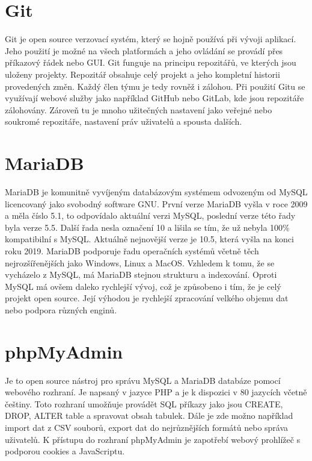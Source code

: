 \section{Git}

Git je open source verzovací systém, který se hojně používá při vývoji
aplikací. Jeho použití je možné na všech platformách a jeho ovládání
se provádí přes příkazový řádek nebo GUI. Git funguje na principu
repozitářů, ve kterých jsou uloženy projekty. Repozitář obsahuje celý
projekt a jeho kompletní historii provedených změn. Každý člen týmu je
tedy rovněž i zálohou. Při použití Gitu se využívají webové služby
jako například GitHub nebo GitLab, kde jsou repozitáře
zálohovány. Zároveň tu je mnoho užitečných nastavení jako veřejné nebo
soukromé repozitáře, nastavení práv uživatelů a spousta dalších.

\newpage

\section{MariaDB}

MariaDB je komunitně vyvíjeným databázovým systémem odvozeným od MySQL
licencovaný jako svobodný software GNU. První verze MariaDB vyšla v
roce 2009 a měla číslo 5.1, to odpovídalo aktuální verzi MySQL,
poslední verze této řady byla verze 5.5. Další řada nesla označení 10
a lišila se tím, že už nebyla 100\% kompatibilní s MySQL. Aktuálně
nejnovější verze je 10.5, která vyšla na konci roku 2019. MariaDB
podporuje řadu operačních systémů včetně těch nejrozšířenějších jako
Windows, Linux a MacOS. Vzhledem k tomu, že se vycházelo z MySQL, má
MariaDB stejnou strukturu a indexování. Oproti MySQL má ovšem daleko
rychlejší vývoj, což je způsobeno i tím, že je celý projekt open
source. Její výhodou je rychlejší zpracování velkého objemu dat nebo
podpora různých enginů.

\section{phpMyAdmin}

Je to open source nástroj pro správu MySQL a MariaDB databáze pomocí
webového rozhraní. Je napsaný v jazyce PHP a je k dispozici v 80
jazycích včetně češtiny. Toto rozhraní umožňuje provádět SQL příkazy
jako jsou CREATE, DROP, ALTER table a spravovat obsah tabulek. Dále je
zde možno například import dat z CSV souborů, export dat do
nejrůznějších formátů nebo správa uživatelů. K přístupu do rozhraní
phpMyAdmin je zapotřebí webový prohlížeč s podporou cookies a
JavaScriptu.




\textbf{}
\textit{}
